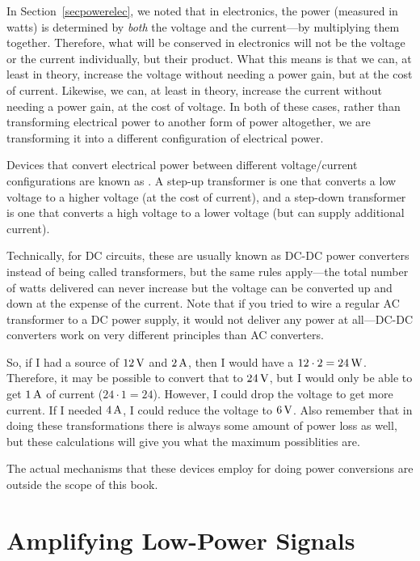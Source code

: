 In Section~\ref{secpowerelec}, we noted that in electronics, the power (measured in watts) is determined by \emph{both} the voltage and the current---by multiplying them together.
Therefore, what will be conserved in electronics will not be the voltage or the current individually, but their product.
What this means is that we can, at least in theory, increase the voltage without needing a power gain, but at the cost of current.
Likewise, we can, at least in theory, increase the current without needing a power gain, at the cost of voltage.
In both of these cases, rather than transforming electrical power to another form of power altogether, we are transforming it into a different configuration of electrical power.

Devices that convert electrical power between different voltage/current configurations are known as .
A step-up transformer is one that converts a low voltage to a higher voltage (at the cost of current), and a step-down transformer is one that converts a high voltage to a lower voltage (but can supply additional current).

Technically, for DC circuits, these are usually known as DC-DC power converters instead of being called transformers, but the same rules apply---the total number of watts delivered can never increase but the voltage can be converted up and down at the expense of the current.
Note that if you tried to wire a regular AC transformer to a DC power supply, it would not deliver any power at all---DC-DC converters work on very different principles than AC converters.

So, if I had a source of $12\,\si{\volt}$ and $2\,\si{\ampere}$, then I would have a $12\cdot 2=24\,\si{\watt}$.
Therefore, it may be possible to convert that to $24\,\si{\volt}$, but I would only be able to get $1\,\si{\ampere}$ of current ($24\cdot 1=24$).
However, I could drop the voltage to get more current.  
If I needed $4\,\si{\ampere}$, I could reduce the voltage to $6\,\si{\volt}$.
Also remember that in doing these transformations there is always some amount of power loss as well, but these calculations will give you what the maximum possiblities are.

The actual mechanisms that these devices employ for doing power conversions are outside the scope of this book.

\section{Amplifying Low-Power Signals}

